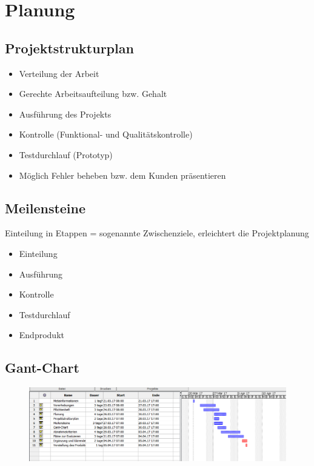 \section{Planung}
\subsection{Projektstrukturplan}


\begin{itemize}
	\item Verteilung der Arbeit
	\item Gerechte Arbeitsaufteilung bzw. Gehalt
	\item Ausführung des Projekts
	\item Kontrolle (Funktional- und Qualitätskontrolle)
	\item Testdurchlauf (Prototyp)
	\item Möglich Fehler beheben bzw. dem Kunden präsentieren
\end{itemize}

\subsection{Meilensteine}
Einteilung in Etappen = sogenannte Zwischenziele, erleichtert die Projektplanung


\begin{itemize}
	\item Einteilung
	\item Ausführung
	\item Kontrolle
	\item Testdurchlauf
	\item Endprodukt
\end{itemize}



\subsection{Gant-Chart}

\begin{figure}
	\centering
	\includegraphics[width=1.2\linewidth]{screenshot001}
	\caption{}
	\label{fig:screenshot001}
\end{figure}


